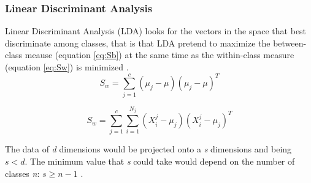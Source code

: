 \subsubsection{Linear Discriminant Analysis}
Linear Discriminant Analysis (LDA) looks for the vectors in the space that best discriminate among classes, that is that LDA pretend to maximize the between-class meause (equation \ref{eq:Sb}) at the same time as the within-class measure (equation \ref{eq:Sw}) is minimized \cite{PCAvsLDA}.\\

\begin{equation}
S_w = \sum^c_{j=1}(\mu _j - \mu)(\mu _j - \mu)^T
\end{equation}\label{eq:Sb}

\begin{equation}
S_w = \sum^c_{j=1}\sum^{N_j}_{i=1}(X_i^j - \mu _j)(X_i^j - \mu _j)^T
\end{equation}\label{eq:Sw}

The data of \textit{d} dimensions would be projected onto a \textit{s} dimensions and being $s < d$. The minimum value that \textit{s} could take would depend on the number of classes \textit{n}: $s \geq n-1$ .


